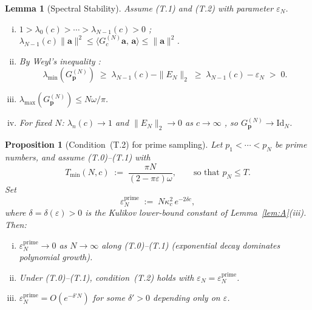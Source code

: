 \documentclass[12pt,a4paper]{amsart}
\newtheorem{lemma}[theorem]{Lemma}
\newtheorem{proposition}[theorem]{Proposition}
\theoremstyle{definition}
\newcommand{\Kul}{\kappa_c}
\newcommand{\GVM}{G^{(N)}_{\mathbf{p}}}
\newcommand{\Tmin}{T_{\min}}
\newcommand{\EN}{E_N}
\newcommand{\norm}[1]{\|#1\|}
\newcommand{\ip}[2]{\langle #1,\, #2\rangle}
\begin{document}
\begin{lemma}[Spectral Stability]\label{lem:C}
Assume (T.1) and (T.2) with parameter $\varepsilon_N$.
\begin{enumerate}[(i)]
\item $1>\lambda_0(c)>\cdots>\lambda_{N-1}(c)>0$ \cite{Slepian1978};
$\lambda_{N-1}(c)\norm{\mathbf{a}}^2\leq
\ip{G_c^{(N)}\mathbf{a}}{\mathbf{a}}\leq\norm{\mathbf{a}}^2$.
\item By Weyl's inequality \cite[Thm.~4.3.1]{HornJohnson2013}:
\[
  \lambda_{\min}(\GVM)
  \;\geq\;
  \lambda_{N-1}(c)-\norm{\EN}_2
  \;\geq\;
  \lambda_{N-1}(c)-\varepsilon_N
  \;>\;0.
\]
\item $\lambda_{\max}(\GVM)\leq N\omega/\pi$.
\item For fixed $N$: $\lambda_n(c)\to1$ and $\norm{\EN}_2\to0$
as $c\to\infty$ \cite{Slepian1978}, so $\GVM\to\mathrm{Id}_N$.
\end{enumerate}
\end{lemma}

\begin{proposition}[Condition~(T.2) for prime sampling]\label{prop:T2}
Let $p_1<\cdots<p_N$ be prime numbers, and assume (T.0)--(T.1) with
\[
  \Tmin(N,c)\;:=\;\frac{\pi N}{(2-\pi\varepsilon)\omega},
  \qquad
  \text{so that }p_N\leq T.
\]
Set
\[
  \varepsilon_N^{\mathrm{prime}}
  \;:=\;
  N\Kul^2\,e^{-2\delta c},
\]
where $\delta=\delta(\varepsilon)>0$ is the Kulikov lower-bound constant
of Lemma~\textup{\ref{lem:A}(iii)}.
Then:
\begin{enumerate}[(i)]
\item $\varepsilon_N^{\mathrm{prime}}\to0$ as $N\to\infty$ along
(T.0)--(T.1) (exponential decay dominates polynomial growth).
\item Under (T.0)--(T.1), condition~(T.2) holds with
$\varepsilon_N=\varepsilon_N^{\mathrm{prime}}$.
\item $\varepsilon_N^{\mathrm{prime}}=O(e^{-\delta'N})$ for some
$\delta'>0$ depending only on $\varepsilon$.
\end{enumerate}
\end{proposition}
\end{document}
